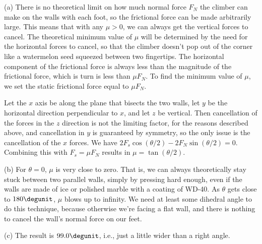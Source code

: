 (a) There is no theoretical limit on how much normal force $F_N$ the climber can make on
the walls with each foot, so the frictional force can be made arbitrarily large. This means
that with any $\mu>0$, we can always get the vertical forces to cancel.
The theoretical minimum value of $\mu$ will be determined by the need for
the horizontal forces to cancel, so that the climber doesn't pop out of the
corner like a watermelon seed squeezed between two fingertips. The horizontal
component of the frictional force is always less than the magnitude of the
frictional force, which is turn is less than $\mu F_N$. To find the minimum
value of $\mu$, we set the static frictional force equal to $\mu F_N$.

Let the $x$ axis be along the plane that bisects the two walls, let $y$
be the horizontal direction perpendicular to $x$, and let $z$ be vertical.
Then cancellation of the forces in the $z$ direction is not the limiting factor,
for the reasons described above, and cancellation in $y$ is guaranteed by
symmetry, so the only issue is the cancellation of the $x$ forces.
We have $2F_s\cos(\theta/2)-2F_N\sin(\theta/2)=0$. Combining this with
$F_s=\mu F_N$ results in $\mu=\tan(\theta/2)$.

(b) For $\theta=0$, $\mu$ is very close to zero. That is,
we can always theoretically stay stuck between two parallel walls, simply by
pressing hard enough, even if the walls are made of ice or polished
marble with a coating of WD-40. As $\theta$ gets close to $180\degunit$,
$\mu$ blows up to infinity. We need at least some dihedral angle to do
this technique, because otherwise we're facing a flat wall, and there is nothing
to cancel the wall's normal force on our feet.

(c) The result is $99.0\degunit$, i.e., just a little wider than a right angle.
%
